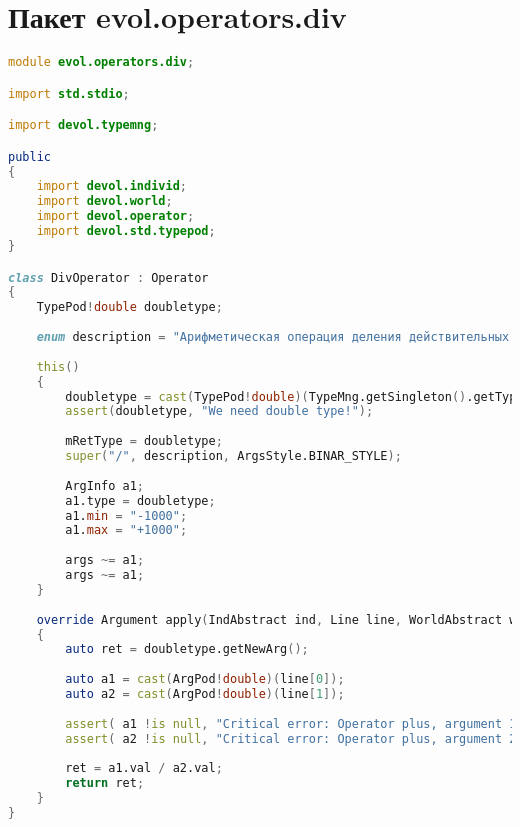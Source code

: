 \documentclass[russian,utf8,emptystyle]{eskdtext}
\begin{document}
\section{Пакет evol.operators.div}
\begin{lstlisting}[language=D]
module evol.operators.div;

import std.stdio;

import devol.typemng;

public
{
    import devol.individ;
    import devol.world;
    import devol.operator;
    import devol.std.typepod;
}

class DivOperator : Operator
{
    TypePod!double doubletype;
    
    enum description = "Арифметическая операция деления действительных чисел.";
    
    this()
    {
        doubletype = cast(TypePod!double)(TypeMng.getSingleton().getType("Typedouble"));
        assert(doubletype, "We need double type!");
        
        mRetType = doubletype;
        super("/", description, ArgsStyle.BINAR_STYLE);
        
        ArgInfo a1;
        a1.type = doubletype;
        a1.min = "-1000";
        a1.max = "+1000";
        
        args ~= a1;
        args ~= a1;
    }
    
    override Argument apply(IndAbstract ind, Line line, WorldAbstract world)
    {
        auto ret = doubletype.getNewArg();
        
        auto a1 = cast(ArgPod!double)(line[0]);
        auto a2 = cast(ArgPod!double)(line[1]);
        
        assert( a1 !is null, "Critical error: Operator plus, argument 1 isn't a right value!");
        assert( a2 !is null, "Critical error: Operator plus, argument 2 isn't a right value!");
        
        ret = a1.val / a2.val;
        return ret;
    }   
}
\end{lstlisting}
\end{document}
